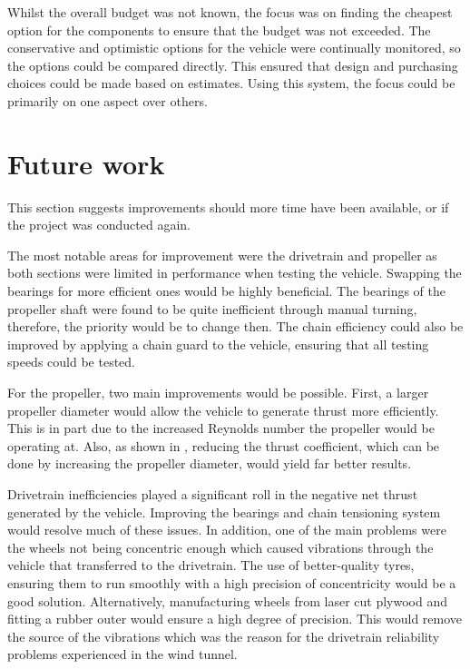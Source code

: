 Whilst the overall budget was not known, the focus was on finding the cheapest option for the components to ensure that the budget was not exceeded. The conservative and optimistic options for the vehicle were continually monitored, so the options could be compared directly. This ensured that design and purchasing choices could be made based on estimates. Using this system, the focus could be primarily on one aspect over others.

\newpage
\section{Future work}

This section suggests improvements should more time have been available, or if the project was conducted again.

The most notable areas for improvement were the drivetrain and propeller as both sections were limited in performance when testing the vehicle. Swapping the bearings for more efficient ones would be highly beneficial. The bearings of the propeller shaft were found to be quite inefficient through manual turning, therefore, the priority would be to change then. The chain efficiency could also be improved by applying a chain guard to the vehicle, ensuring that all testing speeds could be tested. 

For the propeller, two main improvements would be possible. First, a larger propeller diameter would allow the vehicle to generate thrust more efficiently. This is in part due to the increased Reynolds number the propeller would be operating at. Also, as shown in \cite{drela20dead}, reducing the thrust coefficient, which can be done by increasing the propeller diameter, would yield far better results. 


Drivetrain inefficiencies played a significant roll in the negative net thrust generated by the vehicle. Improving the bearings and chain tensioning system would resolve much of these issues. In addition, one of the main problems were the wheels not being concentric enough which caused vibrations through the vehicle that transferred to the drivetrain. The use of better-quality tyres, ensuring them to run smoothly with a high precision of concentricity would be a good solution. Alternatively, manufacturing wheels from laser cut plywood and fitting a rubber outer would ensure a high degree of precision. This would remove the source of the vibrations which was the reason for the drivetrain reliability problems experienced in the wind tunnel.

